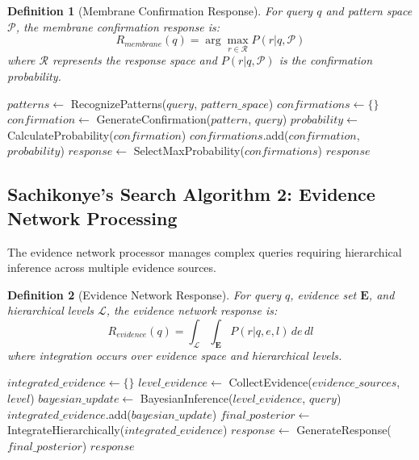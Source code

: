 \documentclass[12pt,a4paper]{article}
\newtheorem{definition}{Definition}
\begin{document}
\begin{definition}[Membrane Confirmation Response]
For query $q$ and pattern space $\mathcal{P}$, the membrane confirmation response is:
\begin{equation}
R_{membrane}(q) = \arg\max_{r \in \mathcal{R}} P(r | q, \mathcal{P})
\end{equation}
where $\mathcal{R}$ represents the response space and $P(r | q, \mathcal{P})$ is the confirmation probability.
\end{definition}

\begin{algorithm}
\caption{Sachikonye's Search Algorithm 1}
\begin{algorithmic}
    \State $patterns \gets$ RecognizePatterns($query$, $pattern\_space$)
    \State $confirmations \gets \{\}$
        \State $confirmation \gets$ GenerateConfirmation($pattern$, $query$)
        \State $probability \gets$ CalculateProbability($confirmation$)
        \State $confirmations$.add($confirmation$, $probability$)
    \EndFor
    \State $response \gets$ SelectMaxProbability($confirmations$)
    \State \Return $response$
\EndProcedure
\end{algorithmic}
\end{algorithm}

\subsection{Sachikonye's Search Algorithm 2: Evidence Network Processing}

The evidence network processor manages complex queries requiring hierarchical inference across multiple evidence sources.

\begin{definition}[Evidence Network Response]
For query $q$, evidence set $\mathbf{E}$, and hierarchical levels $\mathcal{L}$, the evidence network response is:
\begin{equation}
R_{evidence}(q) = \int_{\mathcal{L}} \int_{\mathbf{E}} P(r | q, e, l) \, de \, dl
\end{equation}
where integration occurs over evidence space and hierarchical levels.
\end{definition}

\begin{algorithm}
\caption{Sachikonye's Search Algorithm 2}
\begin{algorithmic}
    \State $integrated\_evidence \gets \{\}$
        \State $level\_evidence \gets$ CollectEvidence($evidence\_sources$, $level$)
        \State $bayesian\_update \gets$ BayesianInference($level\_evidence$, $query$)
        \State $integrated\_evidence$.add($bayesian\_update$)
    \EndFor
    \State $final\_posterior \gets$ IntegrateHierarchically($integrated\_evidence$)
    \State $response \gets$ GenerateResponse($final\_posterior$)
    \State \Return $response$
\EndProcedure
\end{algorithmic}
\end{algorithm}
\end{document}
